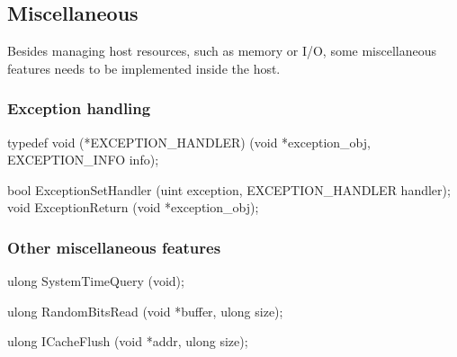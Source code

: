 \subsection{Miscellaneous}
\label{sec:abi:misc}


Besides managing host resources, such as memory or I/O,
some miscellaneous features needs to be implemented inside the host.




\subsubsection*{Exception handling}



\begin{paldef}
typedef void (*EXCEPTION_HANDLER)
            (void *exception_obj, EXCEPTION_INFO info);
\end{paldef}



\begin{paldef}
bool ExceptionSetHandler  (uint exception,
                           EXCEPTION_HANDLER handler);
void ExceptionReturn      (void *exception_obj);
\end{paldef}




\subsubsection*{Other miscellaneous features}



\begin{paldef}
ulong SystemTimeQuery (void);
\end{paldef}


\begin{paldef}
ulong RandomBitsRead (void *buffer, ulong size);
\end{paldef}


\begin{paldef}
ulong ICacheFlush (void *addr, ulong size);
\end{paldef}
